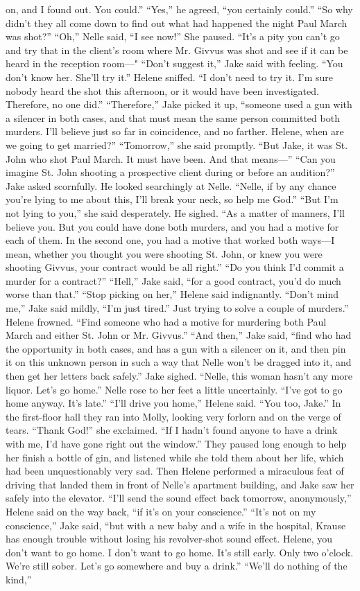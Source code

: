 \documentclass{novel}
\begin{document}
on, and I found out. You could.” “Yes,” he agreed, “you certainly could.” “So why didn’t they all come down to find out what had happened the night Paul March was shot?” “Oh,” Nelle said, “I see now!” She paused. “It’s a pity you can’t go and try that in the client’s room where Mr. Givvus was shot and see if it can be heard in the reception room—" “Don’t suggest it,” Jake said with feeling. “You don’t know her. She’ll try it.” Helene sniffed. “I don’t need to try it. I’m sure nobody heard the shot this afternoon, or it would have been investigated. Therefore, no one did.” “Therefore,” Jake picked it up, “someone used a gun with a silencer in both cases, and that must mean the same person committed both murders. I’ll believe just so far in coincidence, and no farther. Helene, when are we going to get married?” “Tomorrow,” she said promptly. “But Jake, it was St. John who shot Paul March. It must have been. And that means—” “Can you imagine St. John shooting a prospective client during or before an audition?” Jake asked scornfully. He looked searchingly at Nelle. “Nelle, if by any chance you’re lying to me about this, I’ll break your neck, so help me God.” “But I’m not lying to you,” she said desperately. He sighed. “As a matter of manners, I’ll believe you. But you could have done both murders, and you had a motive for each of them. In the second one, you had a motive that worked both ways—I mean, whether you thought you were shooting St. John, or knew you were shooting Givvus, your contract would be all right.” “Do you think I’d commit a murder for a contract?” “Hell,” Jake said, “for a good contract, you’d do much worse than that.” “Stop picking on her,” Helene said indignantly. “Don’t mind me,” Jake said mildly, “I’m just tired.” Just trying to solve a couple of murders.” Helene frowned. “Find someone who had a motive for murdering both Paul March and either St. John or Mr. Givvus.” “And then,” Jake said, “find who had the opportunity in both cases, and has a gun with a silencer on it, and then pin it on this unknown person in such a way that Nelle won’t be dragged into it, and then get her letters back safely.” Jake sighed. “Nelle, this woman hasn’t any more liquor. Let’s go home.” Nelle rose to her feet a little uncertainly. “I’ve got to go home anyway. It’s late.” “I'll drive you home,” Helene said. “You too, Jake.” In the first-floor hall they ran into Molly, looking very forlorn and on the verge of tears. “Thank God!” she exclaimed. “If I hadn’t found anyone to have a drink with me, I’d have gone right out the window.” They paused long enough to help her finish a bottle of gin, and listened while she told them about her life, which had been unquestionably very sad. Then Helene performed a miraculous feat of driving that landed them in front of Nelle’s apartment building, and Jake saw her safely into the elevator. “I’ll send the sound effect back tomorrow, anonymously,” Helene said on the way back, “if it’s on your conscience.” “It’s not on my conscience,” Jake said, “but with a new baby and a wife in the hospital, Krause has enough trouble without losing his revolver-shot sound effect. Helene, you don’t want to go home. I don’t want to go home. It’s still early. Only two o’clock. We’re still sober. Let’s go somewhere and buy a drink.” “We’ll do nothing of the kind,” 
\end{document}
